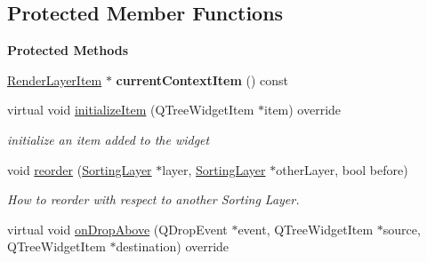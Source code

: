 \subsection*{Protected Member Functions}
\begin{Indent}\textbf{ Protected Methods}\par
\begin{DoxyCompactItemize}
\item 
\mbox{\label{classrev_1_1_view_1_1_render_layer_tree_widget_a7ffffa3110e4a540b3129dfccf17e986}} 
\mbox{\hyperlink{classrev_1_1_view_1_1_render_layer_item}{Render\+Layer\+Item}} $\ast$ {\bfseries current\+Context\+Item} () const
\item 
\mbox{\label{classrev_1_1_view_1_1_render_layer_tree_widget_a4cfa7d5bdf87a2c03ff242d5bd0f5338}} 
virtual void \mbox{\hyperlink{classrev_1_1_view_1_1_render_layer_tree_widget_a4cfa7d5bdf87a2c03ff242d5bd0f5338}{initialize\+Item}} (Q\+Tree\+Widget\+Item $\ast$item) override
\begin{DoxyCompactList}\small\item\em initialize an item added to the widget \end{DoxyCompactList}\item 
\mbox{\label{classrev_1_1_view_1_1_render_layer_tree_widget_a9689c9f0b90f57854178e04e8496fb4a}} 
void \mbox{\hyperlink{classrev_1_1_view_1_1_render_layer_tree_widget_a9689c9f0b90f57854178e04e8496fb4a}{reorder}} (\mbox{\hyperlink{structrev_1_1_sorting_layer}{Sorting\+Layer}} $\ast$layer, \mbox{\hyperlink{structrev_1_1_sorting_layer}{Sorting\+Layer}} $\ast$other\+Layer, bool before)
\begin{DoxyCompactList}\small\item\em How to reorder with respect to another Sorting Layer. \end{DoxyCompactList}\item 
\mbox{\label{classrev_1_1_view_1_1_render_layer_tree_widget_a98996208d3c3c58ee0e328e45d9ab34a}} 
virtual void \mbox{\hyperlink{classrev_1_1_view_1_1_render_layer_tree_widget_a98996208d3c3c58ee0e328e45d9ab34a}{on\+Drop\+Above}} (Q\+Drop\+Event $\ast$event, Q\+Tree\+Widget\+Item $\ast$source, Q\+Tree\+Widget\+Item $\ast$destination) override

\end{DoxyCompactItemize}
\end{Indent}
